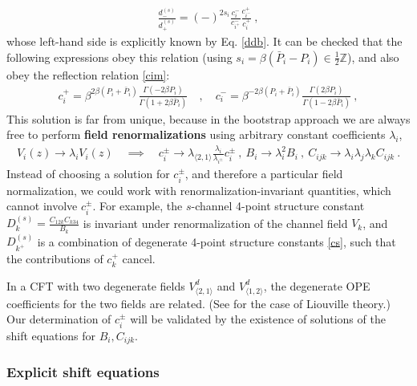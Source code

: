 \documentclass[12pt, a4paper]{article}
\theoremstyle{break}
\begin{document}
\begin{align}
 \frac{d^{(s)}_-}{d^{(s)}_+}= (-)^{2s_i}\frac{c_i^-}{c_{i^+}^-} \frac{c_{i^-}^+}{c_i^+}\ ,  
 \label{ddcccc}
\end{align}
whose left-hand side is explicitly known by Eq. \eqref{ddb}. It can be checked that the following expressions obey this relation (using $s_i=\beta(\bar P_i-P_i) \in \frac12\mathbb{Z}$), and also obey the reflection relation \eqref{cim}: 
\begin{align}
 c^+_i = \beta^{2\beta(P_i+\bar P_i)} \frac{\Gamma(-2\beta P_i)}{\Gamma(1+2\beta \bar P_i)} \quad , \quad c^-_i = \beta^{-2\beta(P_i+\bar P_i)} \frac{\Gamma(2\beta P_i)}{\Gamma(1-2\beta \bar P_i)}\ ,
 \label{cpcm}
\end{align}
This solution is far from unique, because in the bootstrap approach we are always free to perform \textbf{field renormalizations} using arbitrary constant coefficients $\lambda_i$,
\begin{align}
 V_i(z) \to \lambda_i V_i(z)\quad \implies \quad c_i^\pm \to \lambda_{\langle 2,1\rangle}\frac{\lambda_i}{\lambda_{i^\pm}}c_i^\pm \ , \  B_i \to \lambda_i^2B_i \ , \ C_{ijk}\to \lambda_i\lambda_j\lambda_k C_{ijk}\ .
 \label{vlv}
\end{align}
Instead of choosing a solution for $c_i^\pm$, and therefore a particular field normalization, 
we could work with renormalization-invariant quantities, which cannot involve $c_i^\pm$. For example, the $s$-channel 4-point structure constant $D^{(s)}_k = \frac{C_{12k}C_{k34}}{B_k}$ is invariant under renormalization of the channel field $V_k$, and $D^{(s)}_{k^+}$ is a combination of degenerate 4-point structure constants \eqref{cs}, such that the contributions of $c_k^+$ cancel. 

In a CFT with two degenerate fields $V^d_{\langle 2,1\rangle}$ and $V^d_{\langle 1,2\rangle}$, the degenerate OPE coefficients for the two fields are related. (See \cite[Exercise 3.2]{rib14} for the case of Liouville theory.) Our determination of $c_i^\pm$ will be validated by the existence of solutions of the shift equations for $B_i,C_{ijk}$. 


\subsubsection{Explicit shift equations}
\end{document}
